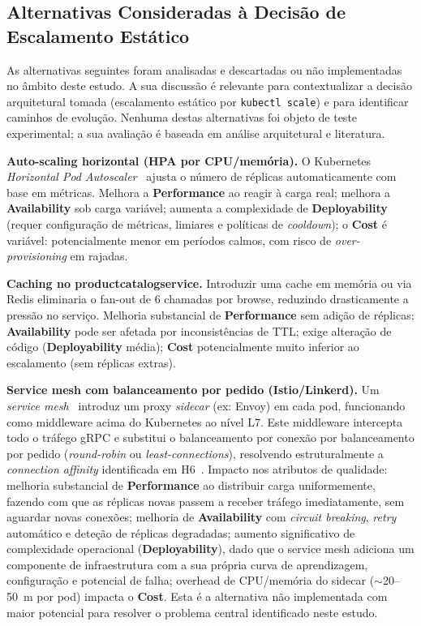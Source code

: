 \documentclass[manuscript,oneside]{acmart}
\begin{document}
\subsection{Alternativas Consideradas à Decisão de Escalamento Estático}

As alternativas seguintes foram analisadas e descartadas ou não implementadas no âmbito deste estudo. A sua discussão é relevante para contextualizar a decisão arquitetural tomada (escalamento estático por \texttt{kubectl scale}) e para identificar caminhos de evolução. Nenhuma destas alternativas foi objeto de teste experimental; a sua avaliação é baseada em análise arquitetural e literatura.

\textbf{Auto-scaling horizontal (HPA por CPU/memória).} O Kubernetes \textit{Horizontal Pod Autoscaler}~\cite{k8shpa} ajusta o número de réplicas automaticamente com base em métricas. Melhora a \textbf{Performance} ao reagir à carga real; melhora a \textbf{Availability} sob carga variável; aumenta a complexidade de \textbf{Deployability} (requer configuração de métricas, limiares e políticas de \textit{cooldown}); o \textbf{Cost} é variável: potencialmente menor em períodos calmos, com risco de \textit{over-provisioning} em rajadas.

\textbf{Caching no productcatalogservice.} Introduzir uma cache em memória ou via Redis eliminaria o fan-out de 6 chamadas por browse, reduzindo drasticamente a pressão no serviço. Melhoria substancial de \textbf{Performance} sem adição de réplicas; \textbf{Availability} pode ser afetada por inconsistências de TTL; exige alteração de código (\textbf{Deployability} média); \textbf{Cost} potencialmente muito inferior ao escalamento (sem réplicas extras).

\textbf{Service mesh com balanceamento por pedido (Istio/Linkerd).} Um \textit{service mesh}~\cite{servicemesh} introduz um proxy \textit{sidecar} (ex: Envoy) em cada pod, funcionando como middleware acima do Kubernetes ao nível L7. Este middleware intercepta todo o tráfego gRPC e substitui o balanceamento por conexão por balanceamento por pedido (\textit{round-robin} ou \textit{least-connections}), resolvendo estruturalmente a \textit{connection affinity} identificada em H6~\cite{k8sgrpc}. Impacto nos atributos de qualidade: melhoria substancial de \textbf{Performance} ao distribuir carga uniformemente, fazendo com que as réplicas novas passem a receber tráfego imediatamente, sem aguardar novas conexões; melhoria de \textbf{Availability} com \textit{circuit breaking}, \textit{retry} automático e deteção de réplicas degradadas; aumento significativo de complexidade operacional (\textbf{Deployability}), dado que o service mesh adiciona um componente de infraestrutura com a sua própria curva de aprendizagem, configuração e potencial de falha; overhead de CPU/memória do sidecar ($\sim$20--50~m por pod) impacta o \textbf{Cost}. Esta é a alternativa não implementada com maior potencial para resolver o problema central identificado neste estudo.
\end{document}
